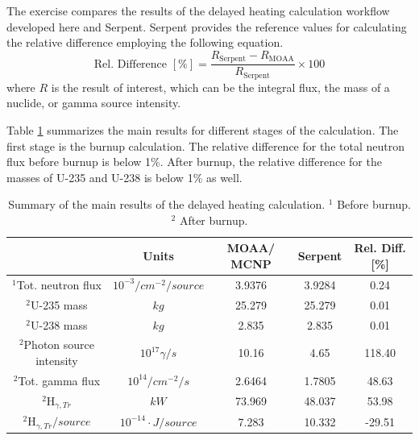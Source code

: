 The exercise compares the results of the delayed heating calculation workflow developed here and Serpent.
Serpent provides the reference values for calculating the relative difference employing the following equation.
\begin{equation}
\textrm{Rel. Difference } [\%] = \frac{R_{\textrm{Serpent}} - R_{\textrm{MOAA}}}{R_{\textrm{Serpent}}} \times 100
\label{eq-rel-diff}
\end{equation}
where $R$ is the result of interest, which can be the integral flux, the mass of a nuclide, or gamma source intensity.

Table \ref{tab:gam-heat-results} summarizes the main results for different stages of the calculation.
The first stage is the burnup calculation.
The relative difference for the total neutron flux before burnup is below 1\%.
After burnup, the relative difference for the masses of U-235 and U-238 is below 1\% as well.

\begin{table}[htbp!]
  \centering
  \caption{Summary of the main results of the delayed heating calculation. $^1$ Before burnup. $^2$ After burnup.}
  \label{tab:gam-heat-results}
  \begin{tabular}{ccccc}
    \toprule
                                & Units                     & MOAA/ MCNP & Serpent & Rel. Diff. [\%] \\
    \midrule
    $^1$Tot. neutron flux       & $10^{-3}/cm^{-2}/source$  & 3.9376  & 3.9284  & 0.24    \\
    $^2$U-235 mass              & $kg$                      & 25.279  & 25.279  & 0.01    \\
    $^2$U-238 mass              & $kg$                      & 2.835   & 2.835   & 0.01    \\
    $^2$Photon source intensity & $10^{17}\gamma/s$         & 10.16   & 4.65    & 118.40  \\
    $^2$Tot. gamma flux         & $10^{14}/cm^{-2}/s$       & 2.6464  & 1.7805  & 48.63   \\
    $^2$H$_{\gamma, Tr}$        & $kW$                      & 73.969  & 48.037  & 53.98   \\
    $^2$H$_{\gamma, Tr}/source$ & $10^{-14} \cdot J/source$ & 7.283   & 10.332  & -29.51  \\
    \bottomrule
  \end{tabular}
\end{table}


